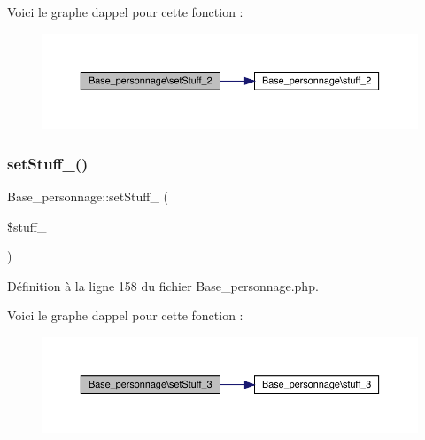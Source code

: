Voici le graphe d\textquotesingle{}appel pour cette fonction \+:\nopagebreak
\begin{figure}[H]
\begin{center}
\leavevmode
\includegraphics[width=350pt]{class_base__personnage_abebf595054cb225477f869946d9ac1ae_cgraph}
\end{center}
\end{figure}
\mbox{\label{class_base__personnage_a7a57cd139690c7a92bf886773171fe86}} 
\subsubsection{\texorpdfstring{set\+Stuff\+\_()}{setStuff\_3()}}
{\footnotesize\ttfamily Base\+\_\+personnage\+::set\+Stuff\+\_ (\begin{DoxyParamCaption}\item[{}]{\$stuff\+\_ }\end{DoxyParamCaption})}



Définition à la ligne 158 du fichier Base\+\_\+personnage.\+php.

Voici le graphe d\textquotesingle{}appel pour cette fonction \+:\nopagebreak
\begin{figure}[H]
\begin{center}
\leavevmode
\includegraphics[width=350pt]{class_base__personnage_a7a57cd139690c7a92bf886773171fe86_cgraph}
\end{center}
\end{figure}
\mbox{\label{class_base__personnage_a19983536bab7533d81e56f5ca2934f2c}} 
